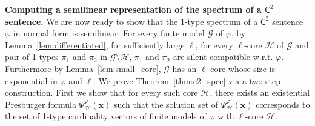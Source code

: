 \documentclass[10pt,a4paper]{article}
\theoremstyle{definition}
\theoremstyle{remark}
\newcommand{\myparagraph}[1]{\medskip\noindent \textbf{#1.}}
\newcommand{\cG}{\mathcal{G}}
\newcommand{\cH}{\mathcal{H}}
\newcommand{\bfx}{\mathbf{x}}
\newcommand{\Ctwo}    {\mathsf{C^2}}
\begin{document}
\myparagraph{Computing a semilinear representation of the spectrum of a $\Ctwo$ sentence}
We are now ready to show that the $1$-type spectrum of a $\Ctwo$ sentence $\varphi$ in normal form is semilinear.
For every finite model $\cG$ of $\varphi$,
by Lemma~\ref{lem:differentiated},
for sufficiently large $\ell$,
for every $\ell$-core $\cH$ of $\cG$
and pair of 1-types $\pi_1$ and $\pi_2$ in $\cG \setminus \cH$,
$\pi_1$ and $\pi_2$ are silent-compatible w.r.t. $\varphi$. 
Furthermore by Lemma~\ref{lem:small_core},
$\cG$ has an $\ell$-core whose size is exponential in $\varphi$ and $\ell$.
We prove Theorem~\ref{thm:c2_spec} via a two-step construction.
First we show that for every such core $\cH$,
there exists an existential Presburger formula $\Psi^\varphi_\cH(\bfx)$
such that the solution set of $\Psi^\varphi_\cH(\bfx)$ corresponds to the set of 1-type cardinality vectors of finite models of $\varphi$ with $\ell$-core $\cH$.
\end{document}
